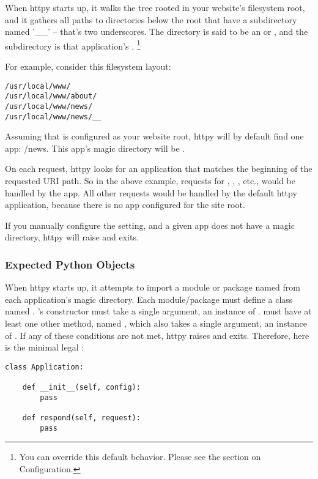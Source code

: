When httpy starts up, it walks the tree rooted in your website's filesystem
root, and it gathers all paths to directories below the root that have a
subdirectory named '__' -- that's two underscores. The directory is said to be
an  or , and the subdirectory is that application's
. \footnote{You can override this default behavior. Please
see the section on Configuration.}

For example, consider this filesystem layout:

\begin{verbatim}
/usr/local/www/
/usr/local/www/about/
/usr/local/www/news/
/usr/local/www/news/__
\end{verbatim}

Assuming that  is configured as your website root, httpy
will by default find one app: /news. This app's magic directory will be
.

On each request, httpy looks for an application that matches the beginning of
the requested URI path. So in the above example, requests for ,
, , etc., would be handled by the
 app. All other requests would be handled by the default httpy
application, because there is no app configured for the site root.

If you manually configure the  setting, and a given app does not have
a magic directory, httpy will raise  and exits.



\subsubsection{Expected Python Objects}

When httpy starts up, it attempts to import a module or package named
 from each application's magic directory. Each 
module/package must define a class named .
's constructor must take a single argument, an instance of
.  must have at least one other method,
named , which also takes a single argument, an instance of
. If any of these conditions are not met, httpy raises
 and exits. Therefore, here is the minimal legal
:

\begin{verbatim}
class Application:

    def __init__(self, config):
        pass

    def respond(self, request):
        pass

\end{verbatim}

